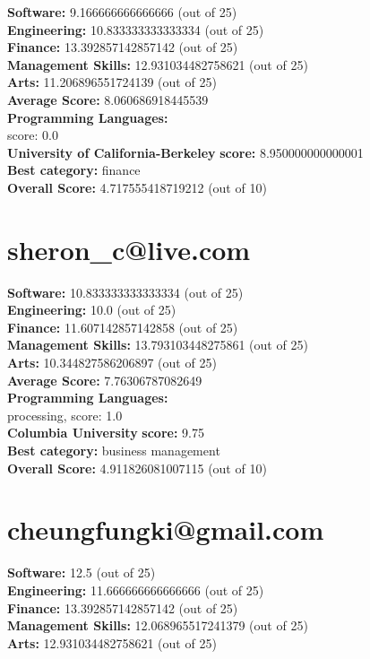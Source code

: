 \documentclass{article}
\begin{document}
\textbf{Software:} 9.166666666666666 (out of 25)\\
\textbf{Engineering: } 10.833333333333334 (out of 25)\\
\textbf{Finance:} 13.392857142857142 (out of 25)\\
\textbf{Management Skills:} 12.931034482758621 (out of 25)\\
\textbf{Arts:} 11.206896551724139 (out of 25)\\
\textbf{Average Score: } 8.060686918445539\\
\textbf{Programming Languages:} \\
score: 0.0\\
\textbf{University of California-Berkeley} \textbf{score:} 8.950000000000001\\
\textbf{Best category: } finance\\
\textbf{Overall Score: }4.717555418719212 (out of 10)\section{sheron_c@live.com}
\textbf{Software:} 10.833333333333334 (out of 25)\\
\textbf{Engineering: } 10.0 (out of 25)\\
\textbf{Finance:} 11.607142857142858 (out of 25)\\
\textbf{Management Skills:} 13.793103448275861 (out of 25)\\
\textbf{Arts:} 10.344827586206897 (out of 25)\\
\textbf{Average Score: } 7.76306787082649\\
\textbf{Programming Languages:} \\
processing, score: 1.0\\
\textbf{Columbia University} \textbf{score:} 9.75\\
\textbf{Best category: } business management\\
\textbf{Overall Score: }4.911826081007115 (out of 10)\section{cheungfungki@gmail.com}
\textbf{Software:} 12.5 (out of 25)\\
\textbf{Engineering: } 11.666666666666666 (out of 25)\\
\textbf{Finance:} 13.392857142857142 (out of 25)\\
\textbf{Management Skills:} 12.068965517241379 (out of 25)\\
\textbf{Arts:} 12.931034482758621 (out of 25)\\
\end{document}
